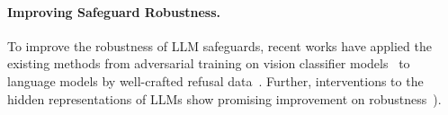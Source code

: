 \paragraph{Improving Safeguard Robustness.} To improve the robustness of LLM safeguards, recent works have applied the existing methods from adversarial training on vision classifier models~\citep{goodfellow2015explainingharnessingadversarialexamples} to language models by well-crafted refusal data~\citep{zhou2024robust,yuan2024refusefeelunsafeimproving,mazeika2024harmbench,ge2023mart}.
Further, interventions to the hidden representations of LLMs show promising improvement on robustness~\citep{zou2023representation,xhonneux2024efficientadversarialtrainingllms,sheshadri2024targeted,zou2024improvingalignmentrobustnesscircuit,tamirisa2024tamperresistantsafeguardsopenweightllms, Cao2015Unlearning, 
bourtoule2021machine, li2024wmdp,sheshadri2024targeted,liu2024large,tamirisa2024tamperresistantsafeguardsopenweightllms,Rosati2024RepresentationNE}).







 




